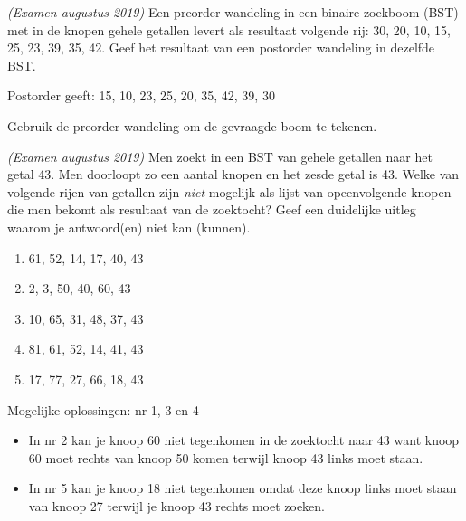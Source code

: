 \begin{oef}
\papier \emph{(Examen augustus 2019)} Een preorder wandeling in een binaire zoekboom (BST) met in de knopen gehele getallen levert als resultaat volgende rij: 30, 20, 10, 15, 25, 23, 39, 35, 42. Geef het resultaat van een postorder wandeling in dezelfde BST.

\begin{opl}
Postorder geeft: 15, 10, 23, 25, 20, 35, 42, 39, 30

Gebruik de preorder wandeling om de gevraagde boom te tekenen.
\end{opl}
\end{oef}


\begin{oef}
\papier \emph{(Examen augustus 2019)} Men zoekt in een BST van gehele getallen naar het getal 43. Men doorloopt zo een aantal knopen en het zesde getal is 43. Welke van volgende rijen van getallen zijn \emph{niet} mogelijk als lijst van opeenvolgende knopen die men bekomt als resultaat van de zoektocht? Geef een duidelijke uitleg waarom je antwoord(en) niet kan (kunnen).
\begin{enumerate}
\item 61, 52, 14, 17, 40, 43
\item 2, 3, 50, 40, 60, 43
\item 10, 65, 31, 48, 37, 43
\item 81, 61, 52, 14, 41, 43
\item 17, 77, 27, 66, 18, 43
\end{enumerate}
\begin{opl}
Mogelijke oplossingen: nr 1, 3 en 4
\begin{itemize}
\item In nr 2 kan je knoop 60 niet tegenkomen in de zoektocht naar 43 want knoop 60 moet rechts van knoop 50 komen terwijl knoop 43 links moet staan.
\item In nr 5 kan je knoop 18 niet tegenkomen omdat deze knoop links moet staan van knoop 27 terwijl je knoop 43 rechts moet zoeken.
\end{itemize}
\end{opl}
\end{oef}




